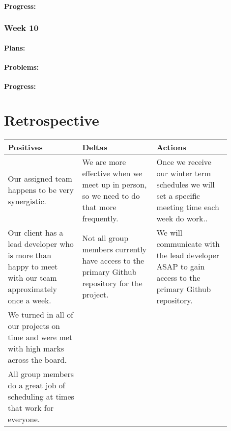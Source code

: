 \documentclass[onecolumn, draftclsnofoot,10pt, compsoc]{article}
\begin{document}
		    \paragraph{Progress:} \hfill \break
		
		\subsubsection{Week 10}
		
		    \paragraph{Plans:} \hfill \break
		
		    \paragraph{Problems:} \hfill \break
		
		    \paragraph{Progress:} \hfill \break
		
		
\section{Retrospective}
\begin{center}
    \begin{tabular}{ |  p{0.3\linewidth} | p{0.3\linewidth} |  p{0.3\linewidth} |}
    \hline
    Positives & Deltas & Actions \\ \hline
    Our assigned team happens to be very synergistic. & We are more effective when we meet up in person, so we need to do that more frequently.
    & Once we receive our winter term schedules we will set a specific meeting time each week do work..  \\ \hline
    Our client has a lead developer who is more than happy to meet with our team approximately once a week. &
    Not all group members currently have access to the primary Github repository for the project. &
    We will communicate with the lead developer ASAP to gain access to the primary Github repository.  \\ \hline
    We turned in all of our projects on time and were met with high marks across the board. & & \\ \hline
    All group members do a great job of scheduling at times that work for everyone. &  & \\ \hline
    \end{tabular}
\end{center}
\end{document}
